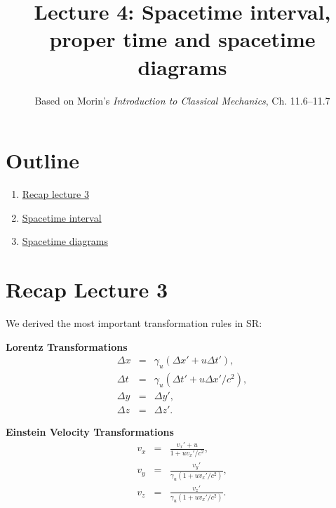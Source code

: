 \documentclass[12pt]{article}
\title{\textbf{Lecture 4: Spacetime interval, proper time and spacetime diagrams}}
\author{Based on Morin's \textit{Introduction to Classical Mechanics}, Ch. 11.6--11.7}
\date{}
\newcommand{\be}{\begin{eqnarray}}
\newcommand{\ee}{\end{eqnarray}}
\begin{document}
\maketitle

\section*{Outline}
\begin{enumerate}
    \item \href{sec:recap}{Recap lecture 3}
    \item \href{sec:S}{Spacetime interval}
    \item \href{sec:SPd}{Spacetime diagrams}
\end{enumerate}

\section{Recap Lecture 3}\label{sec:recap}
We derived the most important transformation rules in SR:
\begin{tcolorbox}[colback=blue!5!white]
{\bf Lorentz Transformations}
\be
\Delta x &=& \gamma_u (\Delta x' + u \Delta t'),\label{eq:xLT} \\
\Delta t &=& \gamma_u (\Delta t' +  u\Delta x' /c^2), \\
\Delta y &=& \Delta y', \\
\Delta z &=& \Delta z'.
\ee
\end{tcolorbox}

\begin{tcolorbox}[colback=blue!5!white]
{\bf Einstein Velocity Transformations}
\be
v_x &=& \frac{v_x' + u}{1+u v_x'/c^2},\\
v_y &=& \frac{v_y'}{\gamma_u(1+ u v_x'/c^2)},\\
v_z &=& \frac{v_z'}{\gamma_u(1+ u v_x'/c^2)}.
\ee
\end{tcolorbox}
\end{document}
